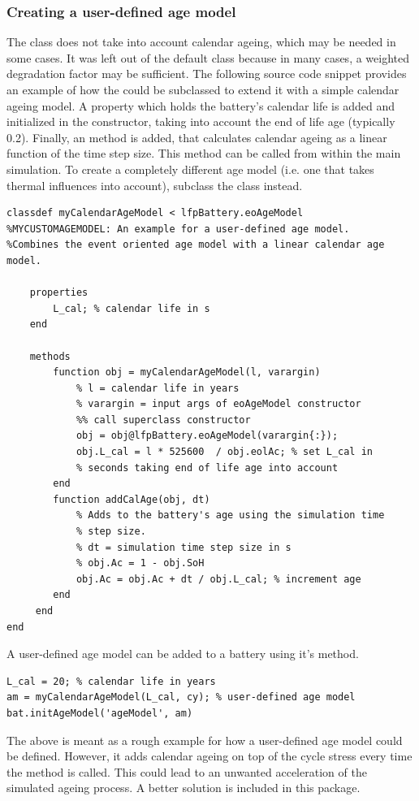 \subsubsection{Creating a user-defined age model}
\label{sec:userAgeModel}
The  class does not take into account calendar ageing, which may be needed in some cases. It was left out of the default class because in many cases, a weighted degradation factor may be sufficient. The following source code snippet provides an example of how the  could be subclassed to extend it with a simple calendar ageing model. A property which holds the battery's calendar life is added and initialized in the constructor, taking into account the end of life age (typically 0.2). Finally, an  method is added, that calculates calendar ageing as a linear function of the time step size. This method can be called from within the main simulation. To create a completely different age model (i.e. one that takes thermal influences into account), subclass the  class instead.
\begin{lstlisting}
classdef myCalendarAgeModel < lfpBattery.eoAgeModel
%MYCUSTOMAGEMODEL: An example for a user-defined age model.
%Combines the event oriented age model with a linear calendar age model.

	properties
		L_cal; % calendar life in s
	end
	
	methods
		function obj = myCalendarAgeModel(l, varargin)
			% l = calendar life in years
			% varargin = input args of eoAgeModel constructor
			%% call superclass constructor
			obj = obj@lfpBattery.eoAgeModel(varargin{:});
			obj.L_cal = l * 525600  / obj.eolAc; % set L_cal in
			% seconds taking end of life age into account
		end
		function addCalAge(obj, dt)
			% Adds to the battery's age using the simulation time
			% step size.
			% dt = simulation time step size in s
			% obj.Ac = 1 - obj.SoH
			obj.Ac = obj.Ac + dt / obj.L_cal; % increment age
	 	end
	 end
end
\end{lstlisting}
\clearpage
A user-defined age model can be added to a battery  using it's  method.
\begin{lstlisting}
L_cal = 20; % calendar life in years
am = myCalendarAgeModel(L_cal, cy); % user-defined age model
bat.initAgeModel('ageModel', am)
\end{lstlisting}
The above is meant as a rough example for how a user-defined age model could be defined. However, it adds calendar ageing on top of the cycle stress every time the  method is called. This could lead to an unwanted acceleration of the simulated ageing process. A better solution is included in this package.

